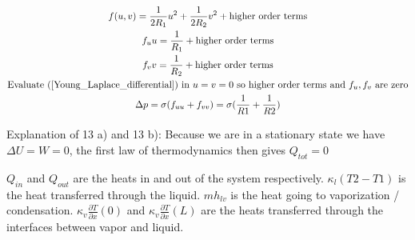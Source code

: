 \documentclass{article}
\begin{document}
\begin{gather}
    f(u,v) = \frac{1}{2R_1}u^2+\frac{1}{2R_2}v^2+\text{higher order terms}\\
    f_uu = \frac{1}{R_1}+\text{higher order terms} \\
    f_vv = \frac{1}{R_2}+\text{higher order terms} \\
    \text{Evaluate (\ref{Young_Laplace_differential}) in $u = v = 0$ so higher order terms and $f_u, f_v$ are zero} \\
    \Delta p  = \sigma (f_{uu}+f_{vv}) = \sigma (\frac{1}{R1}+\frac{1}{R2})
\end{gather}

Explanation of 13 a) and 13 b):
Because we are in a stationary state we have $\Delta U = W = 0$, the first law of thermodynamics then gives $Q_{tot} = 0$

$Q_{in}$ and $Q_{out}$ are the heats in and out of the system respectively.
$\kappa_l(T2-T1)$ is the heat transferred through the liquid.
$mh_{lv}$ is the heat going to vaporization / condensation.
$\kappa_v\frac{\partial T}{\partial x}(0)$ and $\kappa_v\frac{\partial T}{\partial x}(L)$ are the heats transferred through the interfaces between vapor and liquid.



\medskip
 

\end{document}
